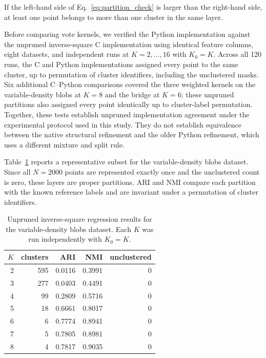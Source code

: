 \documentclass[pdflatex,sn-basic,Numbered]{sn-jnl}
\begin{document}
If the left-hand side of Eq.~\eqref{eq:partition_check} is larger than the right-hand side, at least one point belongs to more than one cluster in the same layer.

Before comparing vote kernels, we verified the Python implementation against
the unpruned inverse-square C implementation using identical feature columns,
eight datasets, and independent runs at $K=2,\ldots,16$ with $K_0=K$.
Across all 120 runs, the C and Python implementations assigned every point
to the same cluster, up to permutation of cluster identifiers, including the
unclustered masks. Six additional C--Python comparisons covered the three
weighted kernels on the variable-density blobs at $K=8$ and the bridge at
$K=6$; these unpruned partitions also assigned every point identically up to
cluster-label permutation. Together, these tests establish unpruned
implementation agreement under the experimental protocol used in this study.
They do not establish equivalence between the native structural refinement
and the older Python refinement, which uses a different mixture and split rule.

Table~\ref{tab:partition_diagnostic} reports a representative subset for the variable-density blobs dataset. Since all $N=2000$ points are represented exactly once and the unclustered count is zero, these layers are proper partitions. ARI and NMI compare each partition with the known reference labels and are invariant under a permutation of cluster identifiers.

\begin{table}[t]
\caption{Unpruned inverse-square regression results for the variable-density blobs dataset. Each $K$ was run independently with $K_0=K$.}\label{tab:partition_diagnostic}
\centering
\begin{tabular}{rrrrr}
\toprule
$K$ & clusters & ARI & NMI & unclustered\\
\midrule
2 & 595 & 0.0116 & 0.3991 & 0\\
3 & 277 & 0.0403 & 0.4491 & 0\\
4 & 99  & 0.2809 & 0.5716 & 0\\
5 & 18  & 0.6661 & 0.8017 & 0\\
6 & 6   & 0.7774 & 0.8941 & 0\\
7 & 5   & 0.7805 & 0.8981 & 0\\
8 & 4   & 0.7817 & 0.9035 & 0\\
\bottomrule
\end{tabular}
\end{table}
\end{document}
